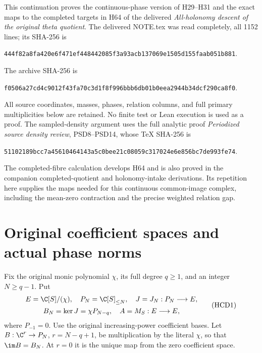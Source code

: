 


This continuation proves the continuous-phase version of H29--H31
and the exact maps to the completed targets in H64 of the delivered
\emph{All-holonomy descent of the original theta quotient}.
The delivered NOTE.tex was read completely, all 1152 lines;
its SHA-256 is
\begin{center}\small
\texttt{444f82a8fa420e6f471ef448442085f3a93acb137069e1505d155faab051b881}.
\end{center}
The archive SHA-256 is
\begin{center}\small
\texttt{f0506a27cd4c9012f43fa70c3d1f8f996bbb6db01b0eea2944b34dcf290ca8f0}.
\end{center}
All source coordinates, masses, phases, relation columns, and full
primary multiplicities below are retained. No finite test or Lean
execution is used as a proof.
The sampled-density argument uses the full analytic proof
\emph{Periodized source density review}, PSD8--PSD14,
whose TeX SHA-256 is
\begin{center}\small
\texttt{51102189bcc7a45610464143a5c0bee21c08059c317024e6e856bc7de993fe74}.
\end{center}
The completed-fibre calculation develops H64 and is also proved
in the companion completed-quotient and holonomy-intake derivations.
Its repetition here supplies the maps needed for this continuous
common-image complex, including the mean-zero contraction and
the precise weighted relation gap.

\section{Original coefficient spaces and actual phase norms}

Fix the original monic polynomial $\chi$, its full degree $q\ge1$,
and an integer $N\ge q-1$. Put
\[
\begin{gathered}
 E=\C[S]/(\chi),\quad P_N=\C[S]_{\le N},\quad
 J=J_N:P_N\longrightarrow E,\\
 B_N=\ker J=\chi P_{N-q},\quad A=M_S:E\longrightarrow E,
\end{gathered}
 \tag{HCD1}
\]
where $P_{-1}=0$. Use the original increasing-power coefficient
bases. Let $B:\C^r\to P_N$, $r=N-q+1$, be multiplication by
the literal $\chi$, so that $\im B=B_N$. At $r=0$ it is the
unique map from the zero coefficient space.

